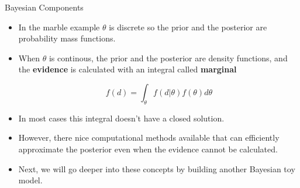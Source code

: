 \documentclass[handout]{beamer}
\begin{document}
\begin{frame}{Bayesian Components}
\scriptsize{
\begin{itemize}

\item In the marble example $\theta$ is discrete so the prior and the posterior are probability mass functions.

\item When $\theta$ is continous, the prior and the posterior are density functions, and the \textbf{evidence} is calculated with an integral called \textbf{marginal}

\begin{equation}
 f(d) = \int_{\theta}f(d|\theta)f(\theta)d\theta  
\end{equation}

\item In most cases this integral doesn't have a closed solution.

\item However, there nice computational methods available that can efficiently approximate the posterior even when the evidence cannot be calculated. 

\item Next, we will go deeper into these concepts by building another Bayesian toy model.
 
\end{itemize}
 } 

\end{frame}
\end{document}
